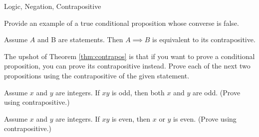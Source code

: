 \begin{section}{Logic, Negation, Contrapositive}
\begin{exercise}
Provide an example of a true conditional proposition whose converse is false.
\end{exercise}

\begin{theorem}\label{thm:contrapos}
Assume $A$ and B are statements.  Then ${A\implies B}$ is equivalent to its contrapositive.
\end{theorem}

The upshot of Theorem \ref{thm:contrapos} is that if you want to prove a conditional proposition, you can prove its contrapositive instead.  Prove each of the next two propositions using the contrapositive of the given statement.

\begin{theorem}[*]
Assume $x$ and $y$ are integers.  If $xy$ is odd, then both $x$ and $y$ are odd. (Prove using contrapositive.)
\end{theorem}

\begin{theorem}[*]
Assume $x$ and $y$ are integers.  If $xy$ is even, then $x$ or $y$ is even.  (Prove using contrapositive.)
\end{theorem}

\end{section}

